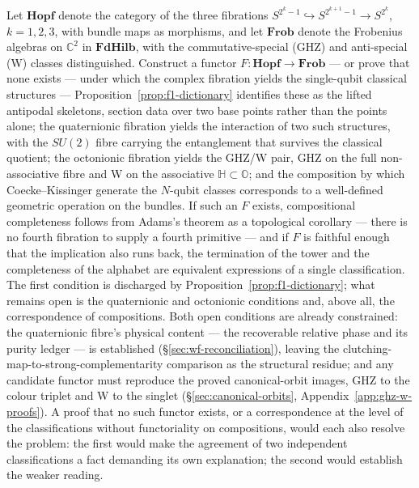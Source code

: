\begin{openproblem}\label{op:hopf-frobenius}
Let $\mathbf{Hopf}$ denote the category of the three fibrations
$S^{2^{k}-1} \hookrightarrow S^{2^{k+1}-1} \to S^{2^{k}}$, $k = 1, 2, 3$, with bundle maps as
morphisms, and let $\mathbf{Frob}$ denote the Frobenius algebras on $\mathbb{C}^{2}$ in
$\mathbf{FdHilb}$, with the commutative-special (GHZ) and anti-special (W) classes distinguished.
Construct a functor $F \colon \mathbf{Hopf} \to \mathbf{Frob}$ --- or prove that none exists ---
under which the complex fibration yields the single-qubit classical structures ---
Proposition~\ref{prop:f1-dictionary} identifies these as the lifted antipodal skeletons, section
data over two base points rather than the points alone; the quaternionic fibration yields the interaction of two such structures,
with the $SU(2)$ fibre carrying the entanglement that survives the classical quotient; the
octonionic fibration yields the GHZ/W pair, GHZ on the full non-associative fibre and W on the
associative $\mathbb{H} \subset \mathbb{O}$; and the composition by which Coecke--Kissinger generate
the $N$-qubit classes corresponds to a well-defined geometric operation on the bundles. If such an
$F$ exists, compositional completeness follows from Adams's theorem as a topological corollary ---
there is no fourth fibration to supply a fourth primitive --- and if $F$ is faithful enough that the
implication also runs back, the termination of the tower and the completeness of the alphabet are
equivalent expressions of a single classification. The first condition is discharged by
Proposition~\ref{prop:f1-dictionary}; what remains open is the quaternionic and octonionic
conditions and, above all, the correspondence of compositions. Both open conditions are already
constrained: the quaternionic fibre's physical content --- the recoverable relative phase and its
purity ledger --- is established (\S\ref{sec:wf-reconciliation}), leaving the
clutching-map-to-strong-complementarity comparison as the structural residue; and any candidate
functor must reproduce the proved canonical-orbit images, GHZ to the colour triplet and W to the
singlet (\S\ref{sec:canonical-orbits}, Appendix~\ref{app:ghz-w-proofs}). A proof that no such functor exists, or a
correspondence at the level of the classifications without functoriality on compositions, would each
also resolve the problem: the first would make the agreement of two independent classifications a
fact demanding its own explanation; the second would establish the weaker reading.
\end{openproblem}

